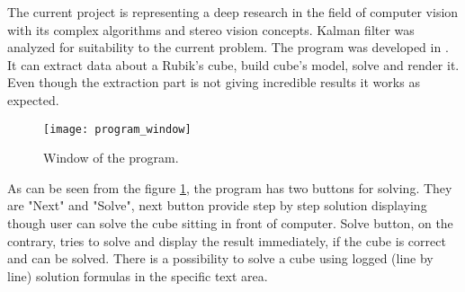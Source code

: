 \documentclass[../main.tex]{subfiles}
\begin{document}
The current project is representing a deep research in the field of computer vision with its complex algorithms and stereo vision concepts. Kalman filter was analyzed for suitability to the current problem. The program was developed in {\Csharp}. It can extract data about a Rubik's cube, build cube's model, solve and render it. Even though the extraction part is not giving incredible results it works as expected.

\begin{figure} [ht!]
    \begin{center}
        \texttt{[image: program\_window]}
        \caption{Window of the program.}
        \label{fig:framework_program_window}
    \end{center}
\end{figure}

As can be seen from the figure \ref{fig:framework_program_window}, the program has two buttons for solving. They are "Next" and "Solve", next button provide step by step solution displaying though user can solve the cube sitting in front of computer. Solve button, on the contrary, tries to solve and display the result immediately, if the cube is correct and can be solved. There is a possibility to solve a cube using logged (line by line) solution formulas in the specific text area.
\end{document}

